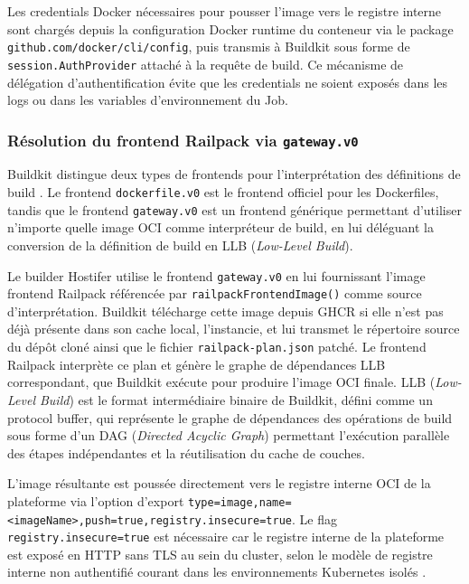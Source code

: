 Les credentials Docker nécessaires pour pousser l'image vers le registre interne sont chargés depuis la configuration Docker runtime du conteneur via le package \texttt{github.com/docker/cli/config}, puis transmis à Buildkit sous forme de \texttt{session.AuthProvider} attaché à la requête de build. Ce mécanisme de délégation d'authentification évite que les credentials ne soient exposés dans les logs ou dans les variables d'environnement du Job.

\subsubsection*{Résolution du frontend Railpack via \texttt{gateway.v0}}

Buildkit distingue deux types de frontends pour l'interprétation des définitions de build \cite{buildkit-deepdive}. Le frontend \texttt{dockerfile.v0} est le frontend officiel pour les Dockerfiles, tandis que le frontend \texttt{gateway.v0} est un frontend générique permettant d'utiliser n'importe quelle image OCI comme interpréteur de build, en lui déléguant la conversion de la définition de build en LLB (\textit{Low-Level Build}). 

Le builder Hostifer utilise le frontend \texttt{gateway.v0} en lui fournissant l'image frontend Railpack référencée par \texttt{railpackFrontendImage()} comme source d'interprétation. Buildkit télécharge cette image depuis GHCR si elle n'est pas déjà présente dans son cache local, l'instancie, et lui transmet le répertoire source du dépôt cloné ainsi que le fichier \texttt{railpack-plan.json} patché. Le frontend Railpack interprète ce plan et génère le graphe de dépendances LLB correspondant, que Buildkit exécute pour produire l'image OCI finale. LLB (\textit{Low-Level Build}) est le format intermédiaire binaire de Buildkit, défini comme un protocol buffer, qui représente le graphe de dépendances des opérations de build sous forme d'un DAG (\textit{Directed Acyclic Graph}) permettant l'exécution parallèle des étapes indépendantes et la réutilisation du cache de couches. 

L'image résultante est poussée directement vers le registre interne OCI de la plateforme via l'option d'export \texttt{type=image,name=<imageName>,push=true,registry.insecure=true}. Le flag \texttt{registry.insecure=true} est nécessaire car le registre interne de la plateforme est exposé en HTTP sans TLS au sein du cluster, selon le modèle de registre interne non authentifié courant dans les environnements Kubernetes isolés \cite{buildkit-client}.

